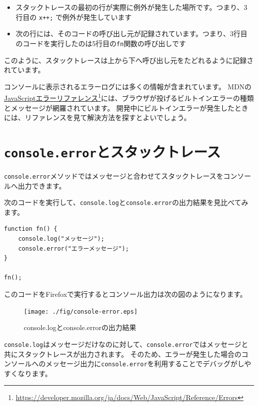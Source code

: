 \begin{itemize}
\item
  スタックトレースの最初の行が実際に例外が発生した場所です。つまり、3行目の
  \texttt{x++;} で例外が発生しています
\item
  次の行には、そのコードの呼び出し元が記録されています。つまり、3行目のコードを実行したのは5行目の\texttt{fn}関数の呼び出しです
\end{itemize}

このように、スタックトレースは上から下へ呼び出し元をたどれるように記録されています。

コンソールに表示されるエラーログには多くの情報が含まれています。
MDNの\href{https://developer.mozilla.org/ja/docs/Web/JavaScript/Reference/Errors}{JavaScriptエラーリファレンス}\footnote{\url{https://developer.mozilla.org/ja/docs/Web/JavaScript/Reference/Errors}}には、ブラウザが投げるビルトインエラーの種類とメッセージが網羅されています。
開発中にビルトインエラーが発生したときには、リファレンスを見て解決方法を探すとよいでしょう。

\hypertarget{console.error}{%
\section{\texorpdfstring{\texttt{console.error}とスタックトレース}{console.errorとスタックトレース}}\label{console.error}}

\texttt{console.error}メソッドではメッセージと合わせてスタックトレースをコンソールへ出力できます。

次のコードを実行して、\texttt{console.log}と\texttt{console.error}の出力結果を見比べてみます。

\begin{lstlisting}
function fn() {
    console.log("メッセージ");
    console.error("エラーメッセージ");
}

fn();
\end{lstlisting}

このコードをFirefoxで実行するとコンソール出力は次の図のようになります。

\begin{figure}[h]
\centering
\texttt{[image: ./fig/console-error.eps]}
\caption{console.logとconsole.errorの出力結果}
\end{figure}

\texttt{console.log}はメッセージだけなのに対して、\texttt{console.error}ではメッセージと共にスタックトレースが出力されます。
そのため、エラーが発生した場合のコンソールへのメッセージ出力に\texttt{console.error}を利用することでデバッグがしやすくなります。

